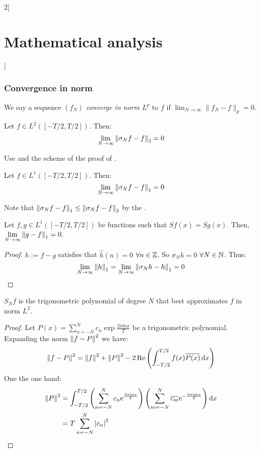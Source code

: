 \documentclass[../../../main_math.tex]{subfiles}
\begin{document}
\begin{multicols}{2}[\section{Mathematical analysis}]
  \subsubsection{Convergence in norm}
  \begin{definition}
    We say a sequence $(f_N)$ \emph{converge in norm $L^p$} to $f$ if $\displaystyle\lim_{N\to\infty}\|f_N-f\|_p=0$.
  \end{definition}
  \begin{theorem}
    Let $f\in L^2([-T/2,T/2])$. Then: $$\lim_{N\to\infty}\left\|\sigma_Nf-f\right\|_2=0$$
  \end{theorem}
  \begin{sproof}
    Use  and the scheme of the proof of .
  \end{sproof}
  \begin{corollary}
    Let $f\in L^1([-T/2,T/2])$. Then: $$\lim_{N\to\infty}\left\|\sigma_Nf-f\right\|_1=0$$
  \end{corollary}
  \begin{sproof}
    Note that $\left\|\sigma_Nf-f\right\|_1\leq\left\|\sigma_Nf-f\right\|_2$ by the .
  \end{sproof}
  \begin{corollary}
    Let $f,g\in L^1([-T/2,T/2])$ be functions such that $Sf(x)=Sg(x)$. Then, $\displaystyle\lim_{N\to\infty}\left\|g-f\right\|_1=0$.
  \end{corollary}
  \begin{proof}
    $h:=f-g$ satisfies that $\widehat{h}(n)=0$ $\forall n\in\mathbb{Z}$. So $\sigma_Nh=0$ $\forall N\in\mathbb{N}$. Thus:
    $$\lim_{N\to\infty}\left\|h\right\|_1=\lim_{N\to\infty}\left\|\sigma_Nh-h\right\|_1=0$$
  \end{proof}
  \begin{theorem}
    $S_Nf$ is the trigonometric polynomial of degree $N$ that best approximates $f$ in norm $L^2$.
  \end{theorem}
  \begin{proof}
    Let $P(x)=\sum_{n=-N}^{N}c_n\exp{\frac{2\pi\ii nx}{T}}$ be a trigonometric polynomial. Expanding the norm $\left\|f-P\right\|^2$ we have:
    $$\left\|f-P\right\|^2=\left\|f\right\|^2+\left\|P\right\|^2-2\Re\left(\int_{-T/2}^{T/2}f(x)\overline{P(x)}\dd{x}\right)$$
    One the one hand:
    \begin{align*}
      \norm{P}^2 & =\int_{-T/2}^{T/2}\left(\sum_{n=-N}^{N}c_n\exp{\frac{2\pi\ii nx}{T}}\right)\left(\sum_{m=-N}^{N}\overline{c_m}\exp{-\frac{2\pi\ii mx}{T}}\right)\dd{x} \\
                 & =T\sum_{n=-N}^{N}\abs{c_n}^2

\end{align*}
\end{proof}
\end{multicols}
\end{document}
